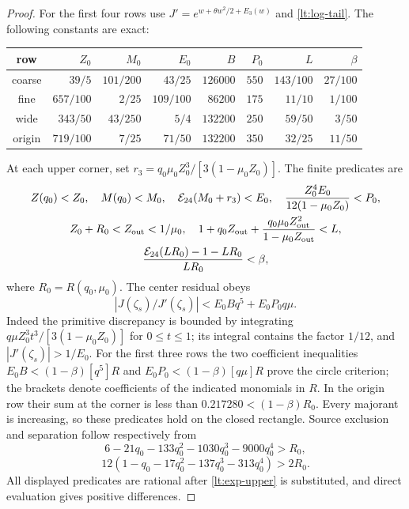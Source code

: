 \begin{proof}
For the first four rows use $J'=e^{w+\theta w^2/2+E_3(w)}$ and
\eqref{lt:log-tail}. The following constants are exact:
\begin{center}\small
\begin{tabular}{c|rrrrrrr}
\toprule
row&$Z_0$&$M_0$&$E_0$&$B$&$P_0$&$L$&$\beta$\\\midrule
coarse&$39/5$&$101/200$&$43/25$&$126000$&$550$&$143/100$&$27/100$\\
fine&$657/100$&$2/25$&$109/100$&$86200$&$175$&$11/10$&$1/100$\\
wide&$343/50$&$43/250$&$5/4$&$132200$&$250$&$59/50$&$3/50$\\
origin&$719/100$&$7/25$&$71/50$&$132200$&$350$&$32/25$&$11/50$\\\bottomrule
\end{tabular}
\end{center}
At each upper corner, set
$r_3=q_0\mu_0 Z_0^3/[3(1-\mu_0Z_0)]$. The finite predicates are
\begin{gather}
 Z(q_0)<Z_0,\quad M(q_0)<M_0,\quad
 \mathcal E_{24}(M_0+r_3)<E_0,\quad
 \frac{Z_0^4E_0}{12(1-\mu_0Z_0)}<P_0,\label{lt:gaussian-gates1}\\
 Z_0+R_0<Z_{\mathrm{out}}<1/\mu_0,\quad
 1+q_0Z_{\mathrm{out}}+
 \frac{q_0\mu_0Z_{\mathrm{out}}^2}{1-\mu_0Z_{\mathrm{out}}}<L,\notag\\
 \frac{\mathcal E_{24}(LR_0)-1-LR_0}{LR_0}<\beta,
 \label{lt:gaussian-gates2}
\end{gather}
where $R_0=R(q_0,\mu_0)$. The center residual obeys
\[
 |J(\zeta_s)/J'(\zeta_s)|<E_0Bq^5+E_0P_0q\mu.
\]
Indeed the primitive discrepancy is bounded by integrating
$q\mu Z_0^3t^3/[3(1-\mu_0Z_0)]$ for $0\le t\le1$; its integral
contains the factor $1/12$, and $|J'(\zeta_s)|>1/E_0$.
For the first three rows the two coefficient inequalities
$E_0B<(1-\beta)[q^5]R$ and
$E_0P_0<(1-\beta)[q\mu]R$ prove the circle criterion; the brackets
denote coefficients of the indicated monomials in $R$.
In the origin
row their sum at the corner is less than $0.217280<(1-\beta)R_0$.
Every majorant is increasing, so these predicates hold on the
closed rectangle. Source exclusion and separation follow respectively
from
\[
 6-21q_0-133q_0^2-1030q_0^3-9000q_0^4>R_0,
\]
\[
 12(1-q_0-17q_0^2-137q_0^3-313q_0^4)>2R_0.
\]
All displayed predicates are rational after \eqref{lt:exp-upper} is
substituted, and direct evaluation gives positive differences.


\end{proof}
